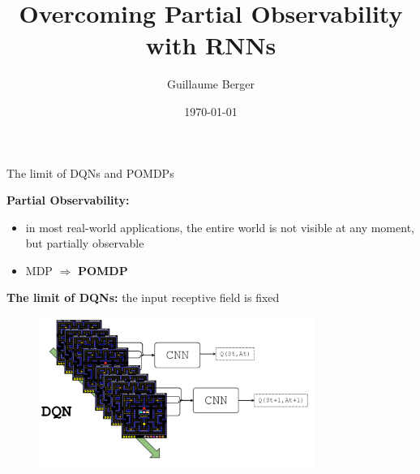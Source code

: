 \documentclass{beamer}
\title[]{Overcoming Partial Observability with RNNs}
\author{Guillaume Berger}
\date{\today}
\begin{document}
\begin{frame}
	\titlepage
\end{frame}

\begin{frame}{The limit of DQNs and POMDPs}
	
	\textbf{Partial Observability:}
	
	\begin{itemize}
		\item in most real-world applications, the entire world is not visible at any moment, but partially observable
		\item MDP $\Rightarrow$ \textbf{POMDP}
	\end{itemize}
	
	\vspace{0.5cm}
	
	\textbf{The limit of DQNs:} the input receptive field is fixed
	
	\begin{figure}[!h]
		\centering
		\includegraphics[width=0.8\textwidth]{imgs/DQN.png}
	\end{figure}
	
\end{frame}
\end{document}
